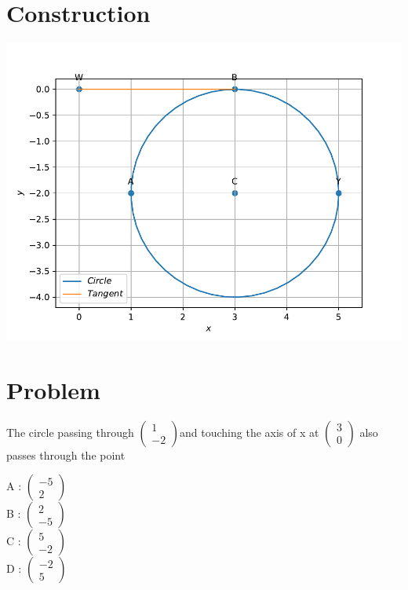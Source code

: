 \documentclass[10pt, a4paper]{article}
\title{\mytitle}
\author{\myauthor\hspace{1em}\\\contact\\FWC22012\hspace{6.5em}IITH\hspace{0.5em}\mymodule\hspace{6em}ASSIGN-5}
\date{}
\newcommand{\myvec}[1]{\ensuremath{\begin{pmatrix}#1\end{pmatrix}}}
\begin{document}
	\maketitle
	\tableofcontents


\section{Construction}
\includegraphics[scale=0.5]{cir.pdf}


\section{Problem}
The circle passing through $\myvec{1\\-2}$and touching the axis of x at $\myvec{3\\0}$ also passes through the point

A : $\myvec{-5\\2}$\\
B : $\myvec{2\\-5}$\\
C : $\myvec{5\\-2}$\\
D : $\myvec{-2\\5}$\\
\end{document}
